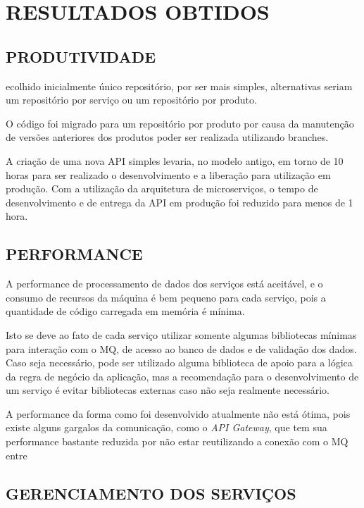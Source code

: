 \chapter{RESULTADOS OBTIDOS}
\label{chp:resultados}

\section{PRODUTIVIDADE}

ecolhido inicialmente único repositório, por ser mais simples, alternativas
seriam um repositório por serviço ou um repositório por produto.

O código foi migrado para um repositório por produto por causa da manutenção
de versões anteriores dos produtos poder ser realizada utilizando branches.

A criação de uma nova \ac{API} simples levaria, no modelo antigo, em torno
de 10 horas para ser realizado o desenvolvimento e a liberação para utilização
em produção. Com a utilização da arquitetura de microserviços, o tempo de
desenvolvimento e de entrega da \ac{API} em produção foi reduzido para
menos de 1 hora.

\section{PERFORMANCE}

A performance de processamento de dados dos serviços está aceitável, e
o consumo de recursos da máquina é bem pequeno para cada serviço, pois
a quantidade de código carregada em memória é mínima.

Isto se deve ao fato de cada serviço utilizar somente algumas
bibliotecas mínimas para interação com o \ac{MQ}, de acesso ao banco de
dados e de validação dos dados. Caso seja necessário, pode ser utilizado
alguma biblioteca de apoio para a lógica da regra de negócio da
aplicação, mas a recomendação para o desenvolvimento de um serviço
é evitar bibliotecas externas caso não seja realmente necessário.

A performance da forma como foi desenvolvido atualmente não está ótima,
pois existe alguns gargalos da comunicação, como o \emph{API Gateway}, que
tem sua performance bastante reduzida por não estar reutilizando a conexão
com o \ac{MQ} entre

\section{GERENCIAMENTO DOS SERVIÇOS}

